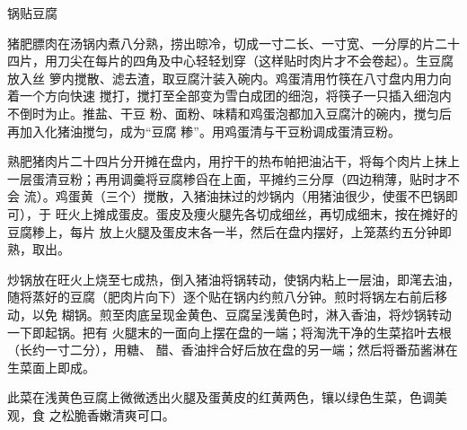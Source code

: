 \begin{recipe}{锅贴豆腐}

\ingredients


\preparation

\step 猪肥膘肉在汤锅内煮八分熟，捞出晾冷，切成一寸二长、一寸宽、一分厚的片二十
四片，用刀尖在每片的四角及中心轻轻划穿（这样贴时肉片才不会卷起）。生豆腐放入丝
箩内搅散、滤去渣，取豆腐汁装入碗内。鸡蛋清用竹筷在八寸盘内用力向着一个方向快速
搅打，搅打至全部变为雪白成团的细泡，将筷子一只插入细泡内不倒时为止。推盐、干豆
粉、面粉、味精和鸡蛋泡都加入豆腐汁的碗内，搅匀后再加入化猪油搅匀，成为“豆腐
糁”。用鸡蛋清与干豆粉调成蛋清豆粉。

\step 熟肥猪肉片二十四片分开摊在盘内，用拧干的热布帕把油沾干，将每个肉片上抹上
一层蛋清豆粉；再用调羹将豆腐糁舀在上面，平摊约三分厚（四边稍薄，贴时才不会
流）。鸡蛋黄（三个）搅散，入猪油抹过的炒锅内（用猪油很少，使蛋不巴锅即可），于
旺火上摊成蛋皮。蛋皮及痩火腿先各切成细丝，再切成细末，按在摊好的豆腐糁上，每片
放上火腿及蛋皮末各一半，然后在盘内摆好，上笼蒸约五分钟即熟，取出。

\step 炒锅放在旺火上烧至七成热，倒入猪油将锅转动，使锅内粘上一层油，即滗去油，
随将蒸好的豆腐（肥肉片向下）逐个贴在锅内约煎八分钟。煎时将锅左右前后移动，以免
糊锅。煎至肉底呈现金黄色、豆腐呈浅黄色时，淋入香油，将炒锅转动一下即起锅。把有
火腿末的一面向上摆在盘的一端；将淘洗干净的生菜掐叶去根（长约一寸二分），用糖、
醋、香油拌合好后放在盘的另一端；然后将番茄酱淋在生菜面上即成。

\features

此菜在浅黄色豆腐上微微透出火腿及蛋黄皮的红黄两色，镶以绿色生菜，色调美观，食
之松脆香嫩清爽可口。

\end{recipe}

